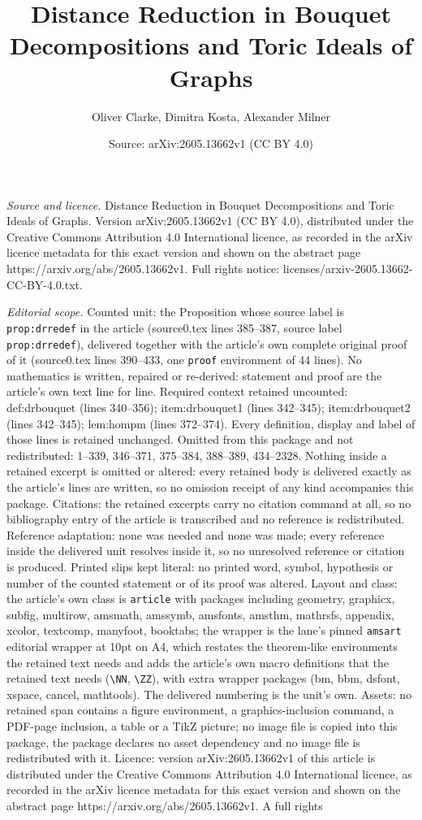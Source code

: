 \documentclass[10pt,a4paper]{amsart}
\title[Distance Reduction in Bouquet Decompositions and Toric Ideal]{Distance Reduction in Bouquet Decompositions and Toric Ideals of Graphs}
\author{Oliver Clarke, Dimitra Kosta, Alexander Milner}
\date{Source: arXiv:2605.13662v1 (CC BY 4.0)}
\begin{document}
\maketitle

\noindent\emph{Source and licence.} Distance Reduction in Bouquet Decompositions and Toric Ideals of Graphs. Version arXiv:2605.13662v1 (CC BY 4.0), distributed under the Creative Commons Attribution 4.0 International licence, as recorded in the arXiv licence metadata for this exact version and shown on the abstract page https://arxiv.org/abs/2605.13662v1. Full rights notice: licenses/arxiv-2605.13662-CC-BY-4.0.txt.\par\smallskip

\noindent\textit{Editorial scope.} Counted unit: the Proposition whose source label is \texttt{prop:drredef} in the article (source0.tex lines 385--387, source label \texttt{prop:drredef}), delivered together with the article's own complete original proof of it (source0.tex lines 390--433, one \texttt{proof} environment of 44 lines). No mathematics is written, repaired or re-derived: statement and proof are the article's own text line for line. Required context retained uncounted: def:drbouquet (lines 340--356); item:drbouquet1 (lines 342--345); item:drbouquet2 (lines 342--345); lem:hompm (lines 372--374). Every definition, display and label of those lines is retained unchanged. Omitted from this package and not redistributed: 1--339, 346--371, 375--384, 388--389, 434--2328. Nothing inside a retained excerpt is omitted or altered: every retained body is delivered exactly as the article's lines are written, so no omission receipt of any kind accompanies this package. Citations: the retained excerpts carry no citation command at all, so no bibliography entry of the article is transcribed and no reference is redistributed. Reference adaptation: none was needed and none was made; every reference inside the delivered unit resolves inside it, so no unresolved reference or citation is produced. Printed slips kept literal: no printed word, symbol, hypothesis or number of the counted statement or of its proof was altered. Layout and class: the article's own class is \texttt{article} with packages including geometry, graphicx, subfig, multirow, amsmath, amssymb, amsfonts, amsthm, mathrsfs, appendix, xcolor, textcomp, manyfoot, booktabs; the wrapper is the lane's pinned \texttt{amsart} editorial wrapper at 10pt on A4, which restates the theorem-like environments the retained text needs and adds the article's own macro definitions that the retained text needs (\texttt{\textbackslash NN}, \texttt{\textbackslash ZZ}), with extra wrapper packages (bm, bbm, dsfont, xspace, cancel, mathtools). The delivered numbering is the unit's own. Assets: no retained span contains a figure environment, a graphics-inclusion command, a PDF-page inclusion, a table or a TikZ picture; no image file is copied into this package, the package declares no asset dependency and no image file is redistributed with it. Licence: version arXiv:2605.13662v1 of this article is distributed under the Creative Commons Attribution 4.0 International licence, as recorded in the arXiv licence metadata for this exact version and shown on the abstract page https://arxiv.org/abs/2605.13662v1. A full rights 
\end{document}
